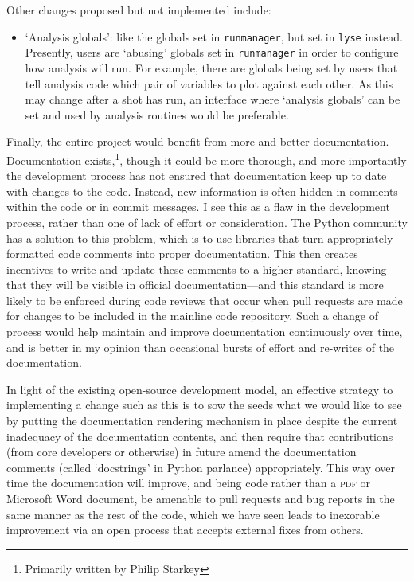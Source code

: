 Other changes proposed but not implemented include:

\begin{itemize}
\item `Analysis globals': like the globals set in \texttt{runmanager}, but set in \texttt{lyse} instead. Presently, users are `abusing' globals set in \texttt{runmanager} in order to configure how analysis will run. For example, there are globals being set by users that tell analysis code which pair of variables to plot against each other. As this may change after a shot has run, an interface where `analysis globals' can be set and used by analysis routines would be preferable.
\end{itemize}

Finally, the entire project would benefit from more and better documentation. Documentation exists,\footnote{Primarily written by Philip Starkey}, though it could be more thorough, and more importantly the development process has not ensured that documentation keep up to date with changes to the code. Instead, new information is often hidden in comments within the code or in commit messages. I see this as a flaw in the development process, rather than one of lack of effort or consideration. The Python community has a solution to this problem, which is to use libraries that turn appropriately formatted code comments into proper documentation. This then creates incentives to write and update these comments to a higher standard, knowing that they will be visible in official documentation---and this standard is more likely to be enforced during code reviews that occur when pull requests are made for changes to be included in the mainline code repository. Such a change of process would help maintain and improve documentation continuously over time, and is better in my opinion than occasional bursts of effort and re-writes of the documentation.

In light of the existing open-source development model, an effective strategy to implementing a change such as this is to sow the seeds what we would like to see by putting the documentation rendering mechanism in place despite the current inadequacy of the documentation contents, and then require that contributions (from core developers or otherwise) in future amend the documentation comments (called `docstrings' in Python parlance) appropriately. This way over time the documentation will improve, and being code rather than a \textsc{pdf} or Microsoft Word document, be amenable to pull requests and bug reports in the same manner as the rest of the code, which we have seen leads to inexorable improvement via an open process that accepts external fixes from others.

